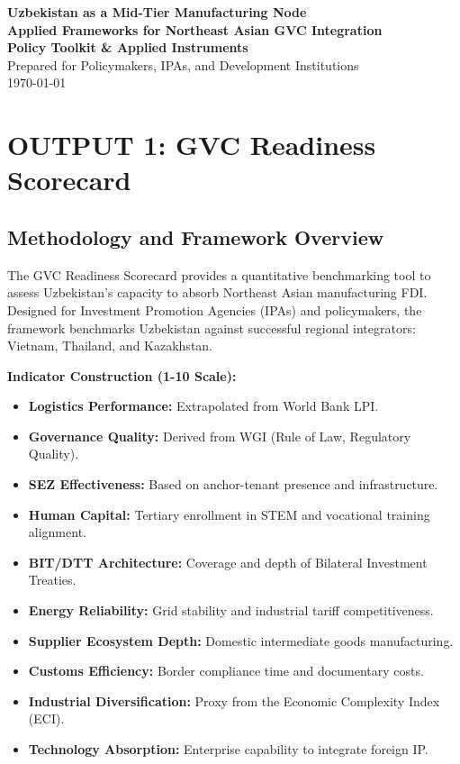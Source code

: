 \documentclass[11pt,a4paper]{article}
\begin{document}
\begin{titlepage}
    \centering
    \vspace*{2cm}
    {\huge\color{adbblue}\textbf{Uzbekistan as a Mid-Tier Manufacturing Node}}\\[1em]
    {\LARGE\color{adblightblue}\textbf{Applied Frameworks for Northeast Asian GVC Integration}}\\[3cm]
    
    {\large \textbf{Policy Toolkit \& Applied Instruments}}\\[0.5em]
    \vfill
    {\large Prepared for Policymakers, IPAs, and Development Institutions}\\[0.5em]
    {\large \today}\\[2cm]
\end{titlepage}

\newpage
\tableofcontents
\newpage

\section{OUTPUT 1: GVC Readiness Scorecard}

\subsection{Methodology and Framework Overview}
The GVC Readiness Scorecard provides a quantitative benchmarking tool to assess Uzbekistan's capacity to absorb Northeast Asian manufacturing FDI. Designed for Investment Promotion Agencies (IPAs) and policymakers, the framework benchmarks Uzbekistan against successful regional integrators: Vietnam, Thailand, and Kazakhstan.

\textbf{Indicator Construction (1-10 Scale):}
\begin{itemize}
    \item \textbf{Logistics Performance:} Extrapolated from World Bank LPI.
    \item \textbf{Governance Quality:} Derived from WGI (Rule of Law, Regulatory Quality).
    \item \textbf{SEZ Effectiveness:} Based on anchor-tenant presence and infrastructure.
    \item \textbf{Human Capital:} Tertiary enrollment in STEM and vocational training alignment.
    \item \textbf{BIT/DTT Architecture:} Coverage and depth of Bilateral Investment Treaties.
    \item \textbf{Energy Reliability:} Grid stability and industrial tariff competitiveness.
    \item \textbf{Supplier Ecosystem Depth:} Domestic intermediate goods manufacturing.
    \item \textbf{Customs Efficiency:} Border compliance time and documentary costs.
    \item \textbf{Industrial Diversification:} Proxy from the Economic Complexity Index (ECI).
    \item \textbf{Technology Absorption:} Enterprise capability to integrate foreign IP.
\end{itemize}
\end{document}
